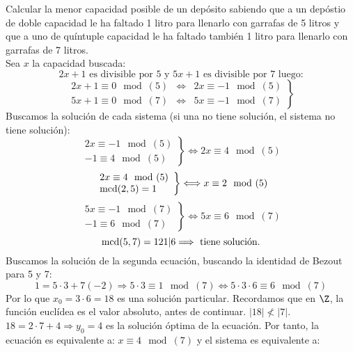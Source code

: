 \begin{ejemplo}
    Calcular la menor capacidad posible de un depósito sabiendo que a un depóstio de doble capacidad le ha faltado 1 litro
    para llenarlo con garrafas de 5 litros y que a uno de quíntuple capacidad le ha faltado también 1 litro para llenarlo
    con garrafas de 7 litros.\\

    \noindent Sea $x$ la capacidad buscada:
    $$2x+1 \mbox{ es divisible por } 5 \mbox{ y } 5x+1 \mbox{ es divisible por } 7 \mbox{ luego:}$$
    $$\left. \begin{array}{rcl}
            2x+1 \equiv0\mod(5) & \Longleftrightarrow & 2x\equiv -1\mod(5) \\
            5x+1 \equiv0\mod(7) & \Longleftrightarrow & 5x\equiv -1\mod(7)
        \end{array} \right\}$$
    Buscamos la solución de cada sistema (si una no tiene solución, el sistema no tiene solución):
    $$\left. \begin{array}{l}
            2x \equiv -1 \mod (5) \\
            -1 \equiv 4 \mod (5)
    \end{array} \right\} \Longleftrightarrow 2x\equiv 4\mod(5)$$
    $$\left. \begin{array}{l}
            2x \equiv 4\mod(5) \\
            \operatorname{mcd}(2,5) = 1
        \end{array} \right\} \Longleftrightarrow x\equiv 2\mod(5)$$
    $$\left. \begin{array}{l}
            5x\equiv -1 \mod(7) \\
            -1\equiv 6\mod(7)
        \end{array} \right\} \Longleftrightarrow 5x\equiv 6\mod(7)$$
    $$\operatorname{mcd}(5,7)=1 2 1|6 \Longrightarrow \mbox{ tiene solución.}$$
    Buscamos la solución de la segunda ecuación, buscando la identidad de Bezout para 5 y 7:
    $$1 = 5\cdot 3 + 7(-2) \Longrightarrow 5\cdot 3 \equiv 1\mod(7) \Longleftrightarrow 5\cdot 3\cdot 6\equiv 6 \mod(7)$$
    Por lo que $x_0=3\cdot 6=18$ es una solución particular.\newline
    Recordamos que en $\Z$, la función euclídea es el valor absoluto, antes de continuar.\newline
    $|18|\not <|7|$. $18=2\cdot 7 + 4 \Longrightarrow y_0=4$ es la solución óptima de la ecuación.\newline
    Por tanto, la ecuación es equivalente a: $x\equiv 4\mod(7)$ y el sistema es equivalente a:


\end{ejemplo}
